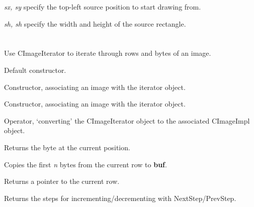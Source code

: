 {\it sx, sy} specify the top-left source position to start drawing from.

{\it sh, sh} specify the width and height of the source rectangle.


\section{}\label{cimageiterator}


Use CImageIterator to iterate through rows and bytes of an image.



Default constructor.


Constructor, associating an image with the iterator object.


Constructor, associating an image with the iterator object.



Operator, `converting' the CImageIterator object to the associated
CImageImpl object.



Returns the byte at the current position.



Copies the first {\it n} bytes from the current row to {\bf buf}.


Returns a pointer to the current row.



Returns the steps for incrementing/decrementing with NextStep/PrevStep.


